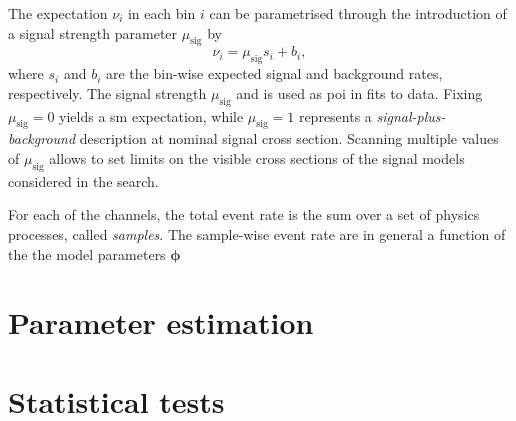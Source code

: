 The expectation $\nu_i$ in each bin $i$ can be parametrised through the introduction of a signal strength parameter $\mu_{\mathrm{sig}}$ by
\begin{equation}
	\nu_i = \mu_{\mathrm{sig}}s_i + b_i,
\end{equation}
where $s_i$ and $b_i$ are the bin-wise expected signal and background rates, respectively. The signal strength $\mu_{\mathrm{sig}}$ and is used as \gls{poi} in fits to data. Fixing $\mu_{\mathrm{sig}} = 0$ yields a \gls{sm} expectation, while $\mu_{\mathrm{sig}} = 1$ represents a \textit{signal-plus-background} description at nominal signal cross section. Scanning multiple values of $\mu_{\mathrm{sig}}$ allows to set limits on the visible cross sections of the signal models considered in the search. 
  
For each of the channels, the total event rate is the sum over a set of physics processes, called \textit{samples}. The sample-wise event rate are in general a function of the the model parameters $\boldsymbol{\phi}$




\section{Parameter estimation}

\section{Statistical tests}